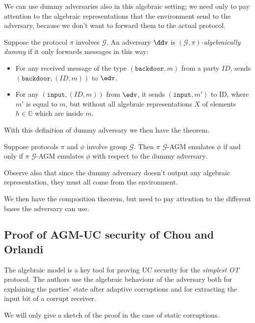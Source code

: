 We can use dummy adversaries also in this algebraic setting; we need only to pay attention to the algebraic representations that the environment send to the adversary, because we don't want to forward them to the actual protocol.

\begin{definition}
    Suppose the protocol $\pi$ involves $\mathcal G$. An adversary $\ddv$ is \emph{$(\mathcal G, \pi)$-algebraically dummy} if it only forwards messages in this way:
    \begin{itemize}
        \item For any received message of the type $(\texttt{backdoor},m)$ from a party $ID$, sends $(\texttt{backdoor},(ID, m))$ to $\edv$.
        \item For any $(\texttt{input},(ID, m))$ from $\edv$, it sends $(\texttt{input}, m')$ to ID, where $m'$ is equal to $m$, but without all algebraic representations $X$ of elements $h\in\mathbb G$ which are inside $m$.
    \end{itemize}
\end{definition}

With this definition of dummy adversary we then have the theorem.

\begin{theorem}
    Suppose protocols $\pi$ and $\phi$ involve group $\mathcal G$. Then $\pi$ $\mathcal G$-AGM emulates $\phi$ if and only if $\pi$ $\mathcal G$-AGM emulates $\phi$ with respect to the dummy adversary.
\end{theorem}

Observe also that since the dummy adversary doesn't output any algebraic representation, they must all come from the environment.

We then have the composition theorem, but need to pay attention to the different bases the adversary can use.

\subsection{Proof of AGM-UC security of Chou and Orlandi}

The algebraic model is a key tool for proving UC security for the \emph{simplest OT} protocol. The authors use the algebraic behaviour of the adversary both for explaining the parties' state after adaptive corruptions and for extracting the input bit of a corrupt receiver.

We will only give a sketch of the proof in the case of static corruptions.

